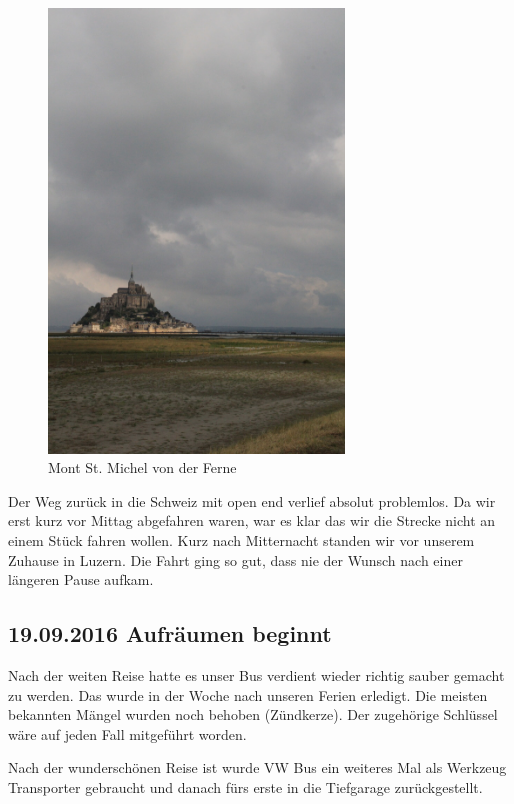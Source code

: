 \begin{figure}[H]
    \centering
    \includegraphics[width=0.7\textwidth]{../Bilder/Bretagne/179.jpg}
    \caption{Mont St. Michel von der Ferne}
    \label{img:Mont St. Michel von der Ferne}
\end{figure}

Der Weg zurück in die Schweiz mit open end verlief absolut problemlos.
Da wir erst kurz vor Mittag abgefahren waren, war es klar das wir die Strecke nicht an einem Stück fahren wollen.
Kurz nach Mitternacht standen wir vor unserem Zuhause in Luzern.
Die Fahrt ging so gut, dass nie der Wunsch nach einer längeren Pause aufkam.

\subsection{19.09.2016 Aufräumen beginnt}
Nach der weiten Reise hatte es unser Bus verdient wieder richtig sauber gemacht zu werden.
Das wurde in der Woche nach unseren Ferien erledigt.
Die meisten bekannten Mängel wurden noch behoben (Zündkerze).
Der zugehörige Schlüssel wäre auf jeden Fall mitgeführt worden.

Nach der wunderschönen Reise ist wurde VW Bus ein weiteres Mal als Werkzeug Transporter gebraucht und danach fürs erste in die Tiefgarage zurückgestellt.
